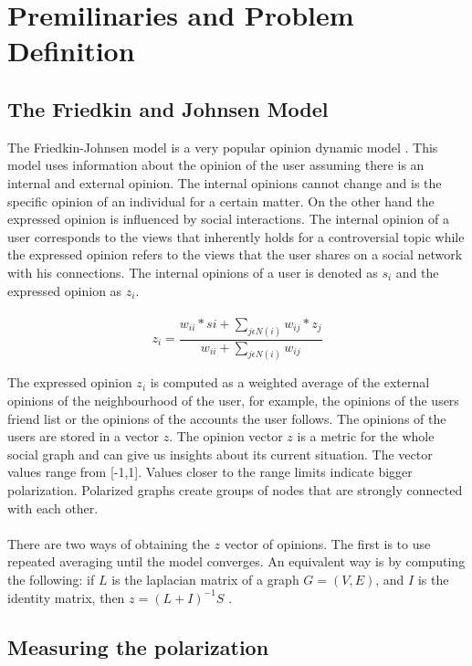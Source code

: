 \chapter{Premilinaries and Problem Definition}
\label{ch:premAndDef}


\section{The Friedkin and Johnsen Model}
\label{sec:prem}

The Friedkin-Johnsen model is a very popular opinion dynamic model \cite{friedkin}. This model uses information about the opinion of the user assuming there is an internal and external opinion. The internal opinions cannot change and is the specific opinion of an individual for a certain matter. On the other hand the expressed opinion is influenced by social interactions. The internal opinion of a user corresponds to the views that inherently holds for a controversial topic while the expressed opinion refers to the views that the user shares on a social network with his connections. The internal opinions of a user is denoted as $s_i$ and the expressed opinion as $z_i$.  
\\
\\
\begin{equation} 
	z_i = \frac{w_{ii}*si + \sum_{j \epsilon N(i) }{w_{ij}*z_j}} {w_{ii} + \sum_{j \epsilon N(i) }{w_{ij}}} 
\end{equation} 
\clearpage

\noindent The expressed opinion $z_i$ is computed as a weighted average of the external opinions of the neighbourhood of the user, for example, the opinions of the users friend list or the opinions of the accounts the user follows. The opinions of the users are stored in a vector $z$. The opinion vector $z$ is a metric for the whole social graph and can give us insights about its current situation. The vector values range from [-1,1]. Values closer to the range limits indicate bigger polarization. Polarized graphs create groups of nodes that are strongly connected with each other.
\\
\\
There are two ways of obtaining the $z$ vector of opinions. The first is to use repeated averaging until the model converges. An equivalent way is by computing the following: if $L$ is the laplacian matrix of a graph $G=(V,E)$, and $I$ is the identity matrix, then $z=(L+I)^{-1}S$ \cite{bindel}. 

\section{Measuring the polarization}
\label{sec:meas}


